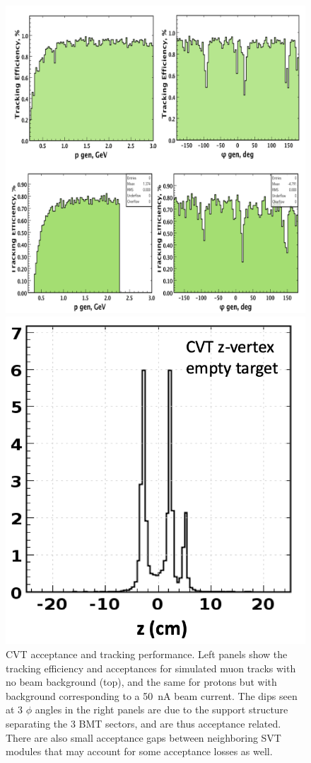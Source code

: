 \documentclass[final,3p,twocolumn]{elsarticle}
\begin{document}
\begin{figure}[t!]
\centerline{\includegraphics[width=1.0\columnwidth]{cvt-acceptance.png}}
\caption{CVT acceptance and tracking performance. Left panels show the tracking efficiency and acceptances
  for simulated muon tracks with no beam background (top), and the same for protons but with background
  corresponding to a 50~nA beam current. The dips seen at 3 $\phi$ angles in the right panels are due
  to the support structure separating the 3 BMT sectors, and are thus acceptance related. There are also 
  small acceptance gaps between neighboring SVT modules that may account for some acceptance losses 
  as well. }
\label{cvt-acceptance}
\vspace{0.3cm}
\centerline{\includegraphics[width=0.8\columnwidth]{cvt-vertex.png}}

\end{figure}
\end{document}
